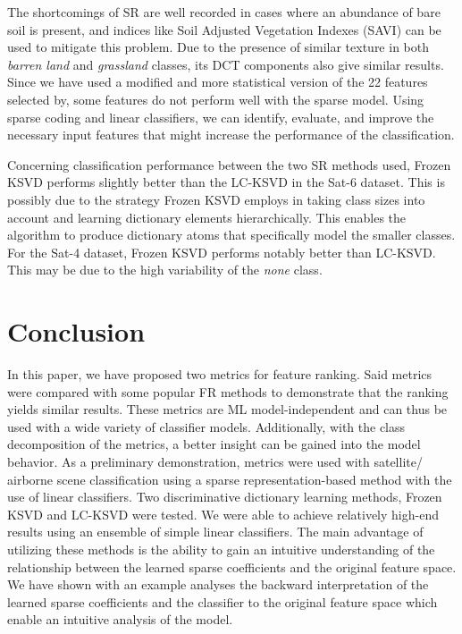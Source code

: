 The shortcomings of SR are well recorded in cases where an abundance of bare soil is present, and indices like Soil Adjusted Vegetation Indexes (SAVI) can be used to mitigate this problem\cite{Huete1988}. Due to the presence of similar texture in both \textit{barren land} and \textit{grassland} classes, its DCT components also give similar results. Since we have used a modified and more statistical version of the 22 features selected by\cite{Basu2015}, some features do not perform well with the sparse model. Using sparse coding and linear classifiers, we can identify, evaluate, and improve the necessary input features that might increase the performance of the classification.

Concerning classification performance between the two SR methods used, Frozen KSVD performs slightly better than the LC-KSVD in the Sat-6 dataset. This is possibly due to the strategy Frozen KSVD employs in taking class sizes into account and learning dictionary elements hierarchically. This enables the algorithm to produce dictionary atoms that specifically model the smaller classes. For the Sat-4 dataset, Frozen KSVD performs notably better than LC-KSVD\@. This may be due to the high variability of the \textit{none} class.

\section{Conclusion}\label{sec:conclusion}

In this paper, we have proposed two metrics for feature ranking. Said metrics were compared with some popular FR methods to demonstrate that the ranking yields similar results. These metrics are ML model-independent and can thus be used with a wide variety of classifier models. Additionally, with the class decomposition of the metrics, a better insight can be gained into the model behavior. As a preliminary demonstration, metrics were used with satellite/ airborne scene classification using a sparse representation-based method with the use of linear classifiers. Two discriminative dictionary learning methods, Frozen KSVD and LC-KSVD were tested. We were able to achieve relatively high-end results using an ensemble of simple linear classifiers. The main advantage of utilizing these methods is the ability to gain an intuitive understanding of the relationship between the learned sparse coefficients and the original feature space. We have shown with an example analyses the backward interpretation of the learned sparse coefficients and the classifier to the original feature space which enable an intuitive analysis of the model. 

